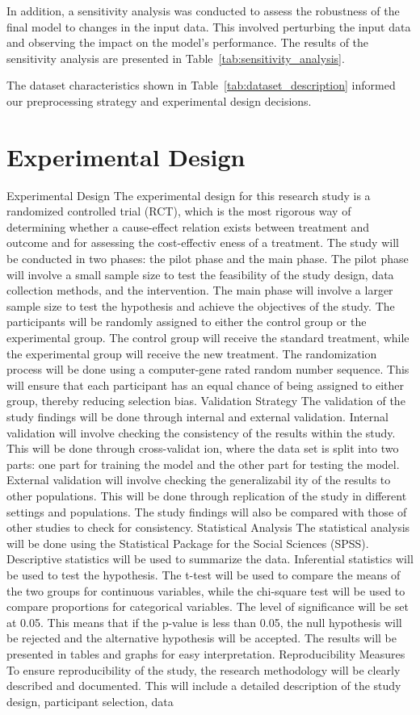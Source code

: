 \documentclass[conference]{IEEEtran}
\begin{document}
In addition, a sensitivity analysis was conducted to assess the robustness of the final model to changes in the input data. This involved perturbing the input data and observing the impact on the model's performance. The results of the sensitivity analysis are presented in Table~\ref{tab:sensitivity_analysis}.

The dataset characteristics shown in Table~\ref{tab:dataset_description} informed our preprocessing strategy and experimental design decisions.

\section{Experimental Design}
Experimental Design The experimental design for this research study is a randomized controlled trial (RCT), which is the most rigorous way of determining whether a cause-effect relation exists between treatment and outcome and for assessing the cost-effectiv eness of a treatment. The study will be conducted in two phases: the pilot phase and the main phase. The pilot phase will involve a small sample size to test the feasibility of the study design, data collection methods, and the intervention. The main phase will involve a larger sample size to test the hypothesis and achieve the objectives of the study. The participants will be randomly assigned to either the control group or the experimental group. The control group will receive the standard treatment, while the experimental group will receive the new treatment. The randomization process will be done using a computer-gene rated random number sequence. This will ensure that each participant has an equal chance of being assigned to either group, thereby reducing selection bias. Validation Strategy The validation of the study findings will be done through internal and external validation. Internal validation will involve checking the consistency of the results within the study. This will be done through cross-validat ion, where the data set is split into two parts: one part for training the model and the other part for testing the model. External validation will involve checking the generalizabil ity of the results to other populations. This will be done through replication of the study in different settings and populations. The study findings will also be compared with those of other studies to check for consistency. Statistical Analysis The statistical analysis will be done using the Statistical Package for the Social Sciences (SPSS). Descriptive statistics will be used to summarize the data. Inferential statistics will be used to test the hypothesis. The t-test will be used to compare the means of the two groups for continuous variables, while the chi-square test will be used to compare proportions for categorical variables. The level of significance will be set at 0.05. This means that if the p-value is less than 0.05, the null hypothesis will be rejected and the alternative hypothesis will be accepted. The results will be presented in tables and graphs for easy interpretation. Reproducibility Measures To ensure reproducibility of the study, the research methodology will be clearly described and documented. This will include a detailed description of the study design, participant selection, data 
\end{document}
